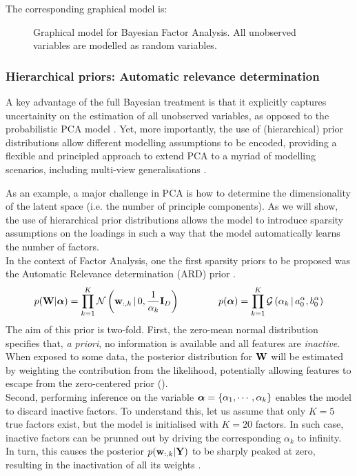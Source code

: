 The corresponding graphical model is:

\begin{figure}[H] 
	\centering
	
	\caption{Graphical model for Bayesian Factor Analysis. All unobserved variables are modelled as random variables.}
	\label{fig:bayesianFA}
\end{figure}

\subsubsection{Hierarchical priors: Automatic relevance determination} \label{section_ard}

A key advantage of the full Bayesian treatment is that it explicitly captures uncertainity on the estimation of all unobserved variables, as opposed to the probabilistic PCA model \cite{Bishop1999a,Bishop1999b}. Yet, more importantly, the use of (hierarchical) prior distributions allow different modelling assumptions to be encoded, providing a flexible and principled approach to extend PCA to a myriad of modelling scenarios, including multi-view generalisations \cite{Klami2008,Virtanen2012,Klami2015,Bunte2016,Khan2014,Zhao2016}.

As an example, a major challenge in PCA is how to determine the dimensionality of the latent space (i.e. the number of principle components). As we will show, the use of hierarchical prior distributions allows the model to introduce sparsity assumptions on the loadings in such a way that the model automatically learns the number of factors.\\
In the context of Factor Analysis, one the first sparsity priors to be proposed was the Automatic Relevance determination (ARD) prior \cite{Neal1995,Mackay1996,Bishop1999a,Bishop1999b}. 
\begin{equation*} \label{eq:ard}
	p({\bf W}|\mbox{\boldmath $\alpha$}) = \prod_{k=1}^{K} \mathcal{N}\left({\bf w}_{:,k} \,|\, 0,\frac{1}{\alpha_{k}}{\bf I}_{D}\right) \\
	\qquad\qquad
	p(\mbox{\boldmath $\alpha$}) = \prod_{k=1}^{K} \mathcal{G}\left(\alpha_k \,|\, a_0^\alpha, b_0^\alpha\right)
\end{equation*}
The aim of this prior is two-fold. First, the zero-mean normal distribution specifies that, \textit{a priori}, no information is available and all features are \textit{inactive}. When exposed to some data, the posterior distribution for ${\bf W}$ will be estimated by weighting the contribution from the likelihood, potentially allowing features to escape from the zero-centered prior ().\\
Second, performing inference on the variable $\mbox{\boldmath $\alpha$} = \{ \alpha_1, \cdots, \alpha_k \}$ enables the model to discard inactive factors. To understand this, let us assume that only $K=5$ true factors exist, but the model is initialised with $K=20$ factors. In such case, inactive factors can be prunned out by driving the corresponding $\alpha_k$ to infinity. In turn, this causes the posterior $p({\bf w}_{:,k}|{\bf Y})$ to be sharply peaked at zero, resulting in the inactivation of all its weights .

